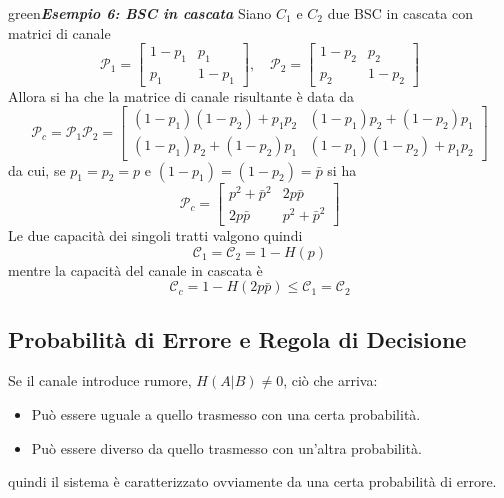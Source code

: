 \begin{mybox}{green}{\textbf{\textit{Esempio 6: BSC in cascata}}}
Siano $C_1$ e $C_2$ due BSC in cascata con matrici di canale
\begin{equation*}
    \mathcal{P}_1 = \begin{bmatrix}
    1-p_1 & p_1 \\
    p_1 & 1-p_1
    \end{bmatrix}, \quad 
    \mathcal{P}_2 = \begin{bmatrix}
    1-p_2 & p_2 \\
    p_2 & 1-p_2
    \end{bmatrix}
\end{equation*}
Allora si ha che la matrice di canale risultante \`e data da
\begin{equation*}
    \mathcal{P}_c = \mathcal{P}_1 \mathcal{P}_2 = \begin{bmatrix}
    (1-p_1)(1-p_2) + p_1p_2 & (1-p_1)p_2 + (1-p_2)p_1 \\
    (1-p_1)p_2 + (1-p_2)p_1 & (1-p_1)(1-p_2) + p_1p_2
    \end{bmatrix}
\end{equation*}
da cui, se $p_1 = p_2 = p$ e $(1-p_1)=(1-p_2) = \bar{p}$ si ha
\begin{equation*}
    \mathcal{P}_c = \begin{bmatrix}
    p^2 + \bar{p}^2 & 2 p \bar{p} \\
    2 p \bar{p} & p^2 + \bar{p}^2
    \end{bmatrix}
\end{equation*}
Le due capacit\`a dei singoli tratti valgono quindi
\begin{equation*}
    \mathcal{C}_1 = \mathcal{C}_2 = 1 - H(p)
\end{equation*}
mentre la capacit\`a del canale in cascata \`e
\begin{equation*}
    \mathcal{C}_c = 1 - H(2p\bar{p}) \leq \mathcal{C}_1 = \mathcal{C}_2
\end{equation*}
\end{mybox}
\subsection{Probabilit\`a di Errore e Regola di Decisione}
Se il canale introduce rumore, $H(A|B) \neq 0$, ciò che arriva:
\begin{itemize}
    \item Può essere uguale a quello trasmesso con una certa probabilità.
    \item Può essere diverso da quello trasmesso con un’altra probabilità.
\end{itemize}
quindi il sistema è caratterizzato ovviamente da una certa probabilità di errore.

